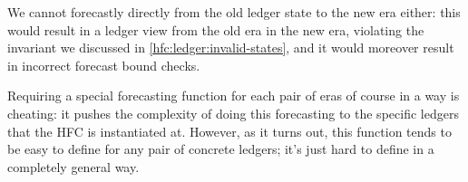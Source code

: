 We cannot forecastly directly from the old ledger state to the new era either: this would result in a ledger view from the old era in the new era, violating the invariant we discussed in \cref{hfc:ledger:invalid-states}, and it would moreover result in incorrect forecast
bound checks.

Requiring a special forecasting function for each pair of eras of course in a
way is cheating: it pushes the complexity of doing this forecasting to the
specific ledgers that the HFC is instantiated at. However, as it turns out, this
function tends to be easy to define for any pair of concrete ledgers; it's just
hard to define in a completely general way.
